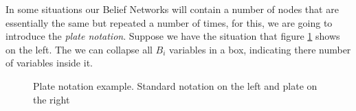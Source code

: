 In some situations our Belief Networks will contain a number of nodes that are
essentially the same but repeated a number of times, for this, we are going to
introduce the \emph{plate notation}. Suppose we have the situation that figure
\ref{fig:plate_notation} shows on the left. The we can collapse all \(B_i\)
variables in a box, indicating there number of variables inside it.

\begin{figure}[ht!]
\centering
{}
\caption{Plate notation example. Standard notation on the left and plate on the right}
\label{fig:plate_notation}
\end{figure}
